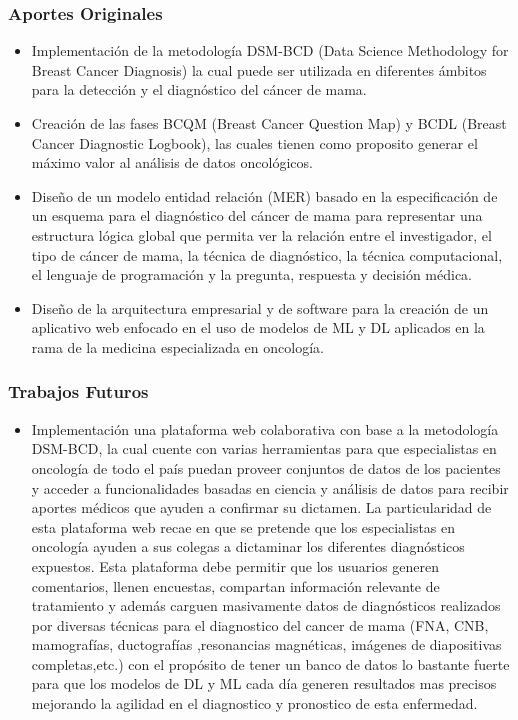 \documentclass[xcolor=dvipsnames,xcolor=table,10pt]{beamer} %
\begin{document}
\begin{frame}
	\frametitle{Aportes Originales}
	\begin{itemize}\justifying
		\item Implementación de la metodología DSM-BCD (Data Science Methodology for Breast Cancer Diagnosis) la cual puede ser utilizada en diferentes ámbitos para la detección y el diagnóstico del cáncer de mama.
		\item Creación de las fases BCQM (Breast Cancer Question Map) y BCDL (Breast Cancer Diagnostic Logbook), las cuales tienen como proposito generar el máximo valor al análisis de datos oncológicos. 
		\item Diseño de un modelo entidad relación (MER) basado en la especificación de un esquema para el diagnóstico del cáncer de mama para representar una estructura lógica global que permita ver la relación entre el investigador, el tipo de cáncer de mama, la técnica de diagnóstico, la técnica computacional, el lenguaje de programación  y la pregunta, respuesta y decisión médica.
		\item Diseño de la arquitectura empresarial y de software para la creación de un aplicativo web enfocado en el uso de modelos de ML y DL aplicados en la rama de la medicina especializada en oncología.
	\end{itemize}
\end{frame}

\begin{frame}
	\frametitle{Trabajos Futuros}
	\begin{itemize}\justifying
		\item Implementación una plataforma web colaborativa con base a la  metodología DSM-BCD, la cual cuente  con varias herramientas para que especialistas en oncología de todo el país puedan proveer conjuntos de datos de los pacientes y acceder a funcionalidades basadas en ciencia y análisis de datos para recibir aportes médicos que ayuden a confirmar su dictamen. La particularidad de esta plataforma web recae en que se pretende que los especialistas en oncología ayuden a sus colegas a dictaminar los diferentes diagnósticos expuestos. Esta plataforma debe permitir que los usuarios generen comentarios, llenen encuestas, compartan información relevante de tratamiento y además carguen masivamente datos de diagnósticos realizados por diversas técnicas para el diagnostico del cancer de mama (FNA, CNB, mamografías, ductografías ,resonancias magnéticas, imágenes de diapositivas completas,etc.) con el propósito de tener un banco de datos lo bastante fuerte para que los modelos de DL y ML cada día generen resultados mas precisos mejorando la agilidad en el diagnostico y pronostico de esta enfermedad.
		
	\end{itemize}
\end{frame}
\end{document}
